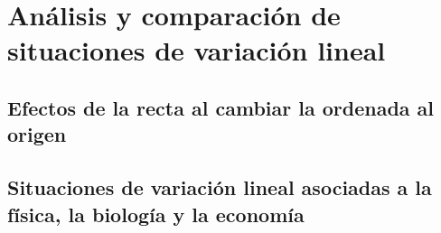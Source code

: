 \thispagestyle{plain}

\section{Análisis y comparación de situaciones de variación lineal}

\subsection{Efectos de la recta al cambiar la ordenada al origen}

\subsection{Situaciones de variación lineal asociadas a la física, la biología y la economía}

\newpage